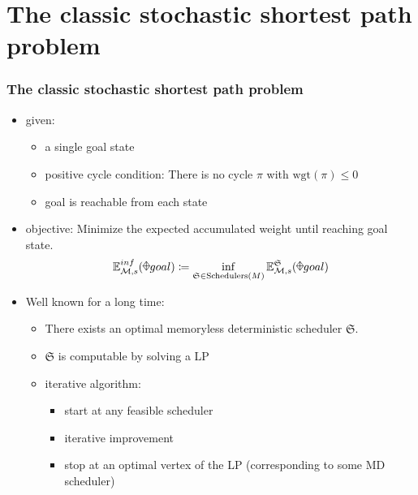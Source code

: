 \documentclass[onlymath]{beamer}
\begin{document}
\section{The classic stochastic shortest path problem}

\begin{frame}
\frametitle{The classic stochastic shortest path problem}
	\begin{itemize}
		\item given:
		\begin{itemize}
			\item a single goal state \pause
			\item positive cycle condition: There is no cycle $\pi$ with ${\mathrm{wgt}(\pi)} \leq 0$ \pause
			\item goal is reachable from each state \pause
		\end{itemize}
		\item objective: Minimize the expected accumulated weight until reaching goal state.\[
			\mathbb{E}_{\mathcal{M},s}^{inf}(\rawdiaplus goal) \coloneqq \inf_{\mathfrak{S} \in \mathrm{Schedulers}(M)}\mathbb{E}_{\mathcal{M},s}^{\mathfrak{S}}(\rawdiaplus goal)
		\] \pause
		\item Well known for a long time:
		\begin{itemize}
			\item There exists an optimal memoryless deterministic scheduler $\mathfrak{S}$. \pause
			\item $\mathfrak{S}$ is computable by solving a LP \pause
			\item iterative algorithm: \pause
			\begin{itemize}
				\item start at any feasible scheduler \pause
				\item iterative improvement \pause
				\item stop at an optimal vertex of the LP (corresponding to some MD scheduler)
			\end{itemize}
		\end{itemize}
	\end{itemize}
\end{frame}%
\end{document}
